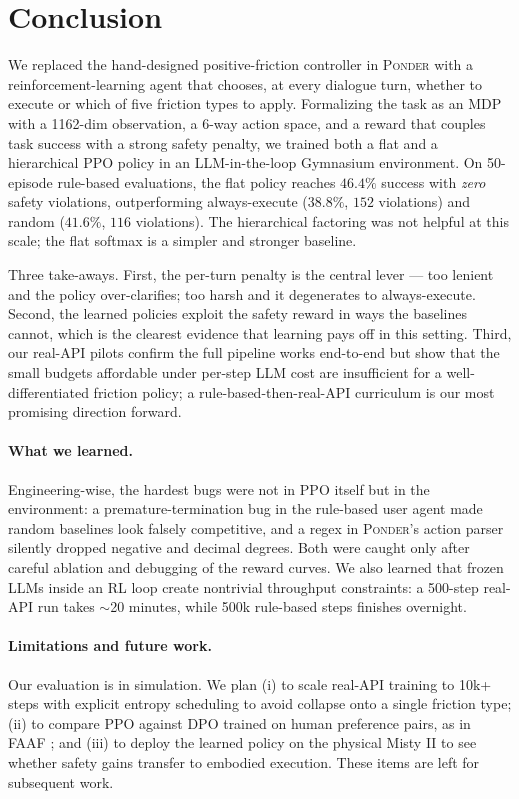 \section{Conclusion}
\label{sec:conclusion}

We replaced the hand-designed positive-friction controller in \textsc{Ponder} with a reinforcement-learning agent that chooses, at every dialogue turn, whether to execute or which of five friction types to apply. Formalizing the task as an MDP with a 1162-dim observation, a 6-way action space, and a reward that couples task success with a strong safety penalty, we trained both a flat and a hierarchical PPO policy in an LLM-in-the-loop Gymnasium environment. On 50-episode rule-based evaluations, the flat policy reaches $46.4\%$ success with \emph{zero} safety violations, outperforming always-execute ($38.8\%$, $152$ violations) and random ($41.6\%$, $116$ violations). The hierarchical factoring was not helpful at this scale; the flat softmax is a simpler and stronger baseline.

Three take-aways. First, the per-turn penalty is the central lever --- too lenient and the policy over-clarifies; too harsh and it degenerates to always-execute. Second, the learned policies exploit the safety reward in ways the baselines cannot, which is the clearest evidence that learning pays off in this setting. Third, our real-API pilots confirm the full pipeline works end-to-end but show that the small budgets affordable under per-step LLM cost are insufficient for a well-differentiated friction policy; a rule-based-then-real-API curriculum is our most promising direction forward.

\paragraph{What we learned.}
Engineering-wise, the hardest bugs were not in PPO itself but in the environment: a premature-termination bug in the rule-based user agent made random baselines look falsely competitive, and a regex in \textsc{Ponder}'s action parser silently dropped negative and decimal degrees. Both were caught only after careful ablation and debugging of the reward curves. We also learned that frozen LLMs inside an RL loop create nontrivial throughput constraints: a 500-step real-API run takes $\sim$20 minutes, while 500k rule-based steps finishes overnight.

\paragraph{Limitations and future work.}
Our evaluation is in simulation. We plan (i) to scale real-API training to 10k+ steps with explicit entropy scheduling to avoid collapse onto a single friction type; (ii) to compare PPO against DPO trained on human preference pairs, as in FAAF \cite{nath2025faaf}; and (iii) to deploy the learned policy on the physical Misty II to see whether safety gains transfer to embodied execution. These items are left for subsequent work.
